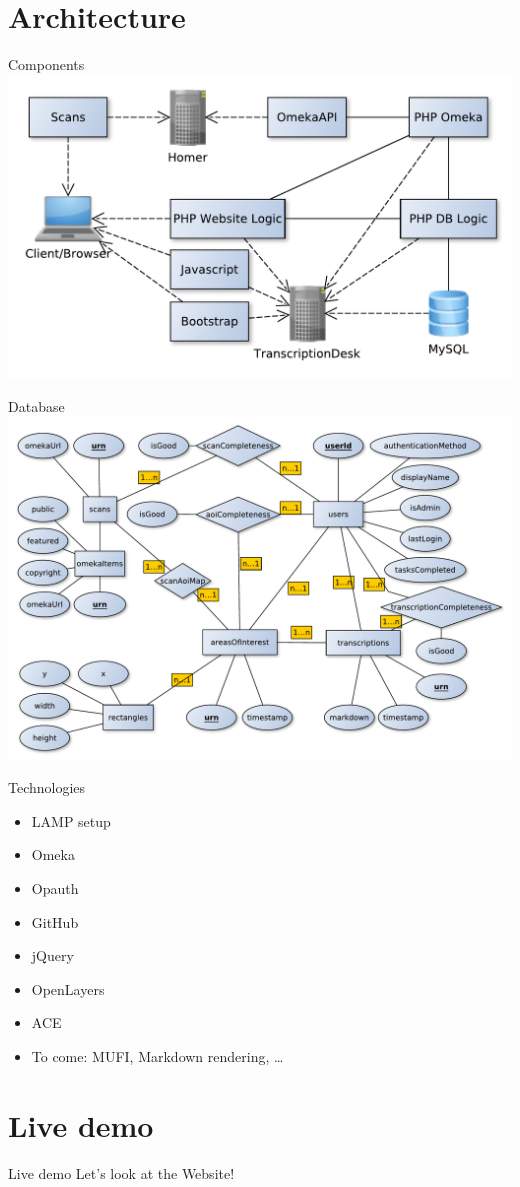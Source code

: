 \documentclass[xcolor=dvipsnames]{beamer}
\begin{document}
\section{Architecture}
\begin{frame}{Components}
\includegraphics[width=\textwidth]{./components.pdf}
\end{frame}
\begin{frame}{Database}
\includegraphics[width=\textwidth]{./ER.pdf}
\end{frame}
\begin{frame}{Technologies}
    \begin{itemize}
        \item LAMP setup
        \item Omeka
        \item Opauth
        \item GitHub
        \item jQuery
        \item OpenLayers
        \item ACE
        \item To come: MUFI, Markdown rendering, …
    \end{itemize}
\end{frame}
\section{Live demo}
\begin{frame}{Live demo}
    Let's look at the Website!
\end{frame}
\end{document}
